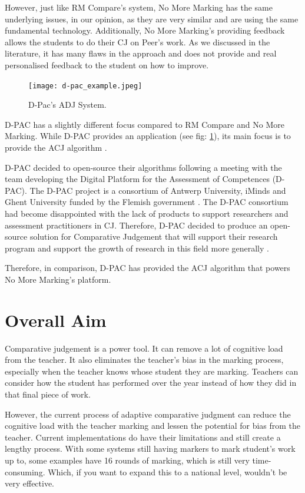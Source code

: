 		However, just like RM Compare's system, No More Marking has the same underlying issues, in our opinion, as they are very similar and are using the same fundamental technology. Additionally, No More Marking's providing feedback allows the students to do their CJ on Peer's work. As we discussed in the literature, it has many flaws in the approach and does not provide and real personalised feedback to the student on how to improve.  
	
	
	\begin{figure}[t]
		\centering
		\texttt{[image: d-pac\_example.jpeg]}
		\caption{D-Pac's ADJ System.}
		\label{fig:d-pac_ex}
		
	\end{figure}

	D-PAC has a slightly different focus compared to RM Compare and No More Marking. While D-PAC provides an application (see fig: \ref{fig:d-pac_ex}), its main focus is to provide the ACJ algorithm \cite{d-pac_blog,d-pac_gh}.
	
	D-PAC decided to open-source their algorithms following a meeting with the team developing the Digital Platform for the Assessment of Competences (D-PAC). The D-PAC project is a consortium of Antwerp University, iMinds and Ghent University funded by the Flemish government \cite{d-pac_blog}. The D-PAC consortium had become disappointed with the lack of products to support researchers and assessment practitioners in CJ. Therefore, D-PAC decided to produce an open-source solution for Comparative Judgement that will support their research program and support the growth of research in this field more generally \cite{d-pac_blog}.
	
	Therefore, in comparison, D-PAC has provided the ACJ algorithm that powers No More Marking's platform.

	
	\section{Overall Aim}
	Comparative judgement is a power tool. It can remove a lot of cognitive load from the teacher. It also eliminates the teacher's bias in the marking process, especially when the teacher knows whose student they are marking. Teachers can consider how the student has performed over the year instead of how they did in that final piece of work.
	
	However, the current process of adaptive comparative judgment can reduce the cognitive load with the teacher marking and lessen the potential for bias from the teacher. Current implementations do have their limitations and still create a lengthy process. With some systems still having markers to mark student's work up to, some examples have 16 rounds of marking, which is still very time-consuming. Which, if you want to expand this to a national level, wouldn't be very effective.
	
